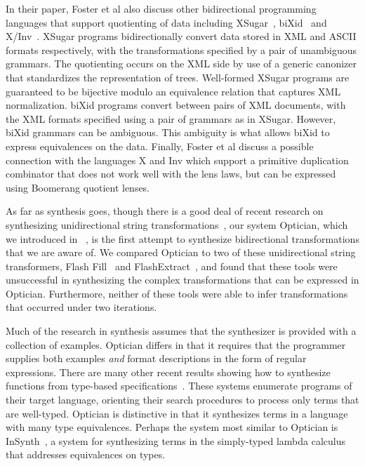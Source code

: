 \documentclass{svproc}
\begin{document}
In their paper, Foster et al also discuss other bidirectional programming
languages that support quotienting of data including XSugar~\cite{xsugar},
biXid~\cite{bixid} and X/Inv~\cite{xinv}. XSugar programs bidirectionally
convert data stored in XML and ASCII formats respectively, with the
transformations specified by a pair of unambiguous grammars. The quotienting
occurs on the XML side by use of a generic canonizer that standardizes the
representation of trees. Well-formed XSugar programs are guaranteed to be
bijective modulo an equivalence relation that captures XML normalization. biXid
programs convert between pairs of XML documents, with the XML formats specified
using a pair of grammars as in XSugar. However, biXid grammars can be ambiguous.
This ambiguity is what allows biXid to express equivalences on the data.
Finally, Foster et al discuss a possible connection with the languages
X and Inv which support a primitive duplication combinator that does not work
well with the lens laws, but can be expressed using Boomerang quotient lenses.

As far as synthesis goes, though there is a good deal of recent research on
synthesizing unidirectional string
transformations~\cite{singh2012learning,le-pldi-2014,gulwani-popl-2014,
perelman2014test,Singh:blinkfill}, our system Optician, which we introduced in
~\cite{popl18}, is the first attempt to synthesize bidirectional
transformations that we are aware of. We compared Optician to two of these
unidirectional string transformers, Flash Fill~\cite{gulwani-popl-2014} and
FlashExtract~\cite{le-pldi-2014}, and found that these tools were unsuccessful
in synthesizing the complex transformations that can be expressed in Optician.
Furthermore, neither of these tools were able to infer transformations 
that occurred under two iterations.

Much of the research in synthesis assumes that the synthesizer is provided with
a collection of examples. Optician differs in that it requires that the
programmer supplies both examples {\em and} format descriptions in the form of
regular expressions. There are many other recent results showing how to
synthesize functions from type-based
specifications~\cite{augustsson-2004,osera+:pldi15,
feser-pldi-2015,scherer-icfp-2015,frankle+:popl16,armando+:pldi16}.
These systems enumerate programs of their target language, orienting their
search procedures to process only terms that are well-typed.
Optician is distinctive in that it synthesizes terms in a language with many
type equivalences. 
Perhaps the system most similar to Optician is InSynth~\cite{gvero-pldi-2013}, a
system for synthesizing terms in the simply-typed lambda calculus that addresses
equivalences on types.  
\end{document}
